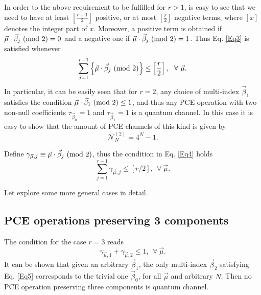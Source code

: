 In order to the above requirement to be fulfilled for $r>1$, is easy to see that we need to have at least $\left[\frac{r+1}{2}\right]$ positive, or at most $\left[\frac{r}{2}\right]$ negative terms, where $\left[x\right]$ denotes the integer part of $x$. Moreover, a positive term is obtained if $\vec{\mu}\cdot\vec{\beta}_{j}\ (\mathrm{mod}\ 2)=0$ and a negative one if $\vec{\mu}\cdot\vec{\beta}_{j}\ (\mathrm{mod}\ 2)=1$. Thus Eq. \ref{Eq3} is satisfied whenever
% 
\begin{equation}
\sum_{j=1}^{r-1} \left\{ \vec{\mu}\cdot\vec{\beta}_{j}\ (\mathrm{mod}\ 2) \right\}\leq \left[\frac{r}{2}\right], ~~\forall ~ \vec{\mu}.
 \label{Eq4}
 \end{equation}
%  
In particular, it can be easily seen that for $r=2$, any choice of multi-index $\vec{\beta}_{1}$ satisfies the condition $\vec{\mu}\cdot\vec{\beta}_{1}\ (\mathrm{mod}\ 2) \leq 1$, and thus any PCE operation with two non-null coefficients $\tau_{\vec{\beta}_0}=1$ and $\tau_{\vec{\beta}_1}=1$ is a quantum channel. In this case it is easy to show that the amount of PCE channels of this kind is given by
% 
\begin{equation}
 \mathcal{N}^{(2)}_N=4^N-1.
\label{Eq10}
 \end{equation}

Define $\gamma_{\vec{\mu}, j} \equiv \vec{\mu}\cdot\vec{\beta}_{j}\ (\mathrm{mod}\ 2)$, thus the condition in Eq. \ref{Eq4} holds
% 
\begin{equation}
\sum_{j=1}^{r-1} \gamma_{\vec{\mu}, j} \leq \left[r/2\right], ~~\forall ~ \vec{\mu}.
 \label{Eq6}
 \end{equation}

Let explore some more general cases in detail.


\subsection{PCE operations preserving 3 components}
% 
The condition for the case $r=3$ reads
% 
\begin{equation}
 \gamma_{\vec{\mu}, 1} +\gamma_{\vec{\mu}, 2}\leq 1, ~~\forall ~ \vec{\mu}.
\label{Eq5}
 \end{equation}
% 
It can be shown that given an arbitrary $\vec{\beta}_{1}$, the only multi-index $\vec{\beta}_{2}$ satisfying Eq. \ref{Eq5} corresponds to the trivial one $\vec{\beta}_{0}$, for all $\vec{\mu}$ and arbitrary $N$. Then no PCE operation preserving three components is quantum channel.


